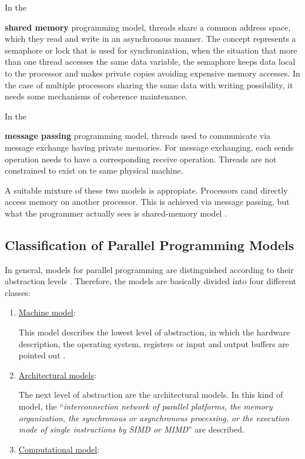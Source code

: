 In the {\textbf{shared memory} programming model, threads share a common address space, which they read and write in an asynchronous manner. The concept represents a semaphore or lock that is used for synchronization, when the situation that more than one thread accesses the same data variable, the semaphore keeps data local to the processor and makes private copies avoiding expensive memory accesses. In the case of multiple processors sharing the same data with writing possibility, it needs some mechanisms of coherence maintenance.
	
In the {\textbf{message passing} programming model, threads used to communicate via message exchange having private memories. For message exchanging, each sends operation needs to have a corresponding receive operation. Threads are not constrained to exist on te same physical machine. 
	
A suitable mixture of these two models is appropiate. Processors cand directly access memory on another processor. This is achieved via message passing, but what the programmer actually sees is shared-memory model \parencite{internet10}.


\subsection{Classification of Parallel Programming Models}

In general, models for parallel programming are distinguished according to their abstraction levels \parencite{book1}. Therefore, the models are basically divided into four different classes:

\begin{enumerate}
	\item \underline{Machine model}:
	
	This model describes the lowest level of abstraction, in which the hardware description, the operating system, registers or input and output buffers are pointed out \parencite[see][p105]{book1}. 
	
	\item \underline{Architectural models}:
	
	The next level of abstraction are the architectural models. In this kind of model, the ``\textit{interconnection network of parallel platforms, the memory organization, the synchronous or asynchronous processing, or the execution mode of single instructions by SIMD or MIMD}'' \parencite[see][p105-106]{book1} are described.
	
	\item \underline{Computational model}:
	

\end{enumerate}}}
